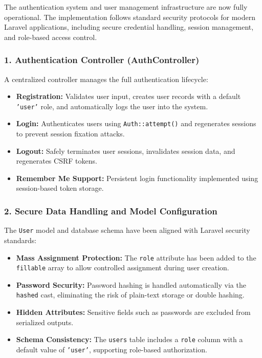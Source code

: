 \documentclass[12pt,a4paper]{article}
\begin{document}
The authentication system and user management infrastructure are now fully operational. The implementation follows standard security protocols for modern Laravel applications, including secure credential handling, session management, and role-based access control.

\subsubsection{1. Authentication Controller (AuthController)}

A centralized controller manages the full authentication lifecycle:

\begin{itemize}[noitemsep]
    \item \textbf{Registration:} Validates user input, creates user records with a default \texttt{'user'} role, and automatically logs the user into the system.
    \item \textbf{Login:} Authenticates users using \texttt{Auth::attempt()} and regenerates sessions to prevent session fixation attacks.
    \item \textbf{Logout:} Safely terminates user sessions, invalidates session data, and regenerates CSRF tokens.
    \item \textbf{Remember Me Support:} Persistent login functionality implemented using session-based token storage.
\end{itemize}

\subsubsection{2. Secure Data Handling and Model Configuration}

The \texttt{User} model and database schema have been aligned with Laravel security standards:

\begin{itemize}[noitemsep]
    \item \textbf{Mass Assignment Protection:} The \texttt{role} attribute has been added to the \texttt{fillable} array to allow controlled assignment during user creation.
    \item \textbf{Password Security:} Password hashing is handled automatically via the \texttt{hashed} cast, eliminating the risk of plain-text storage or double hashing.
    \item \textbf{Hidden Attributes:} Sensitive fields such as passwords are excluded from serialized outputs.
    \item \textbf{Schema Consistency:} The \texttt{users} table includes a \texttt{role} column with a default value of \texttt{'user'}, supporting role-based authorization.
\end{itemize}
\end{document}
